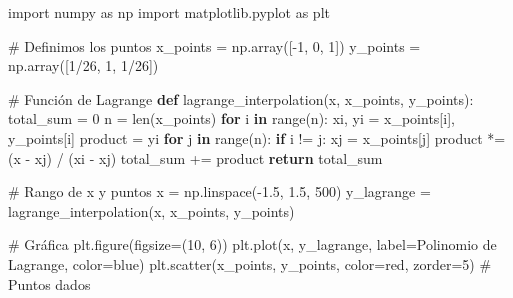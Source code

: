 \documentclass[
  letterpaper,
  DIV=11,
  numbers=noendperiod]{scrartcl}
\newenvironment{Shaded}{\begin{snugshade}}{\end{snugshade}}
\newcommand{\BuiltInTok}[1]{\textcolor[rgb]{0.00,0.23,0.31}{#1}}
\newcommand{\CommentTok}[1]{\textcolor[rgb]{0.37,0.37,0.37}{#1}}
\newcommand{\ControlFlowTok}[1]{\textcolor[rgb]{0.00,0.23,0.31}{\textbf{#1}}}
\newcommand{\DecValTok}[1]{\textcolor[rgb]{0.68,0.00,0.00}{#1}}
\newcommand{\FloatTok}[1]{\textcolor[rgb]{0.68,0.00,0.00}{#1}}
\newcommand{\ImportTok}[1]{\textcolor[rgb]{0.00,0.46,0.62}{#1}}
\newcommand{\KeywordTok}[1]{\textcolor[rgb]{0.00,0.23,0.31}{\textbf{#1}}}
\newcommand{\NormalTok}[1]{\textcolor[rgb]{0.00,0.23,0.31}{#1}}
\newcommand{\OperatorTok}[1]{\textcolor[rgb]{0.37,0.37,0.37}{#1}}
\newcommand{\StringTok}[1]{\textcolor[rgb]{0.13,0.47,0.30}{#1}}
\begin{document}
\begin{Shaded}
\begin{Highlighting}[]
\ImportTok{import}\NormalTok{ numpy }\ImportTok{as}\NormalTok{ np}
\ImportTok{import}\NormalTok{ matplotlib.pyplot }\ImportTok{as}\NormalTok{ plt}

\CommentTok{\# Definimos los puntos}
\NormalTok{x\_points }\OperatorTok{=}\NormalTok{ np.array([}\OperatorTok{{-}}\DecValTok{1}\NormalTok{, }\DecValTok{0}\NormalTok{, }\DecValTok{1}\NormalTok{])}
\NormalTok{y\_points }\OperatorTok{=}\NormalTok{ np.array([}\DecValTok{1}\OperatorTok{/}\DecValTok{26}\NormalTok{, }\DecValTok{1}\NormalTok{, }\DecValTok{1}\OperatorTok{/}\DecValTok{26}\NormalTok{])}

\CommentTok{\# Función de Lagrange}
\KeywordTok{def}\NormalTok{ lagrange\_interpolation(x, x\_points, y\_points):}
\NormalTok{    total\_sum }\OperatorTok{=} \DecValTok{0}
\NormalTok{    n }\OperatorTok{=} \BuiltInTok{len}\NormalTok{(x\_points)}
    \ControlFlowTok{for}\NormalTok{ i }\KeywordTok{in} \BuiltInTok{range}\NormalTok{(n):}
\NormalTok{        xi, yi }\OperatorTok{=}\NormalTok{ x\_points[i], y\_points[i]}
\NormalTok{        product }\OperatorTok{=}\NormalTok{ yi}
        \ControlFlowTok{for}\NormalTok{ j }\KeywordTok{in} \BuiltInTok{range}\NormalTok{(n):}
            \ControlFlowTok{if}\NormalTok{ i }\OperatorTok{!=}\NormalTok{ j:}
\NormalTok{                xj }\OperatorTok{=}\NormalTok{ x\_points[j]}
\NormalTok{                product }\OperatorTok{*=}\NormalTok{ (x }\OperatorTok{{-}}\NormalTok{ xj) }\OperatorTok{/}\NormalTok{ (xi }\OperatorTok{{-}}\NormalTok{ xj)}
\NormalTok{        total\_sum }\OperatorTok{+=}\NormalTok{ product}
    \ControlFlowTok{return}\NormalTok{ total\_sum}

\CommentTok{\# Rango de x y puntos}
\NormalTok{x }\OperatorTok{=}\NormalTok{ np.linspace(}\OperatorTok{{-}}\FloatTok{1.5}\NormalTok{, }\FloatTok{1.5}\NormalTok{, }\DecValTok{500}\NormalTok{)}
\NormalTok{y\_lagrange }\OperatorTok{=}\NormalTok{ lagrange\_interpolation(x, x\_points, y\_points)}

\CommentTok{\# Gráfica}
\NormalTok{plt.figure(figsize}\OperatorTok{=}\NormalTok{(}\DecValTok{10}\NormalTok{, }\DecValTok{6}\NormalTok{))}
\NormalTok{plt.plot(x, y\_lagrange, label}\OperatorTok{=}\StringTok{\textquotesingle{}Polinomio de Lagrange\textquotesingle{}}\NormalTok{, color}\OperatorTok{=}\StringTok{\textquotesingle{}blue\textquotesingle{}}\NormalTok{)}
\NormalTok{plt.scatter(x\_points, y\_points, color}\OperatorTok{=}\StringTok{\textquotesingle{}red\textquotesingle{}}\NormalTok{, zorder}\OperatorTok{=}\DecValTok{5}\NormalTok{)  }\CommentTok{\# Puntos dados}


\end{Highlighting}
\end{Shaded}
\end{document}

